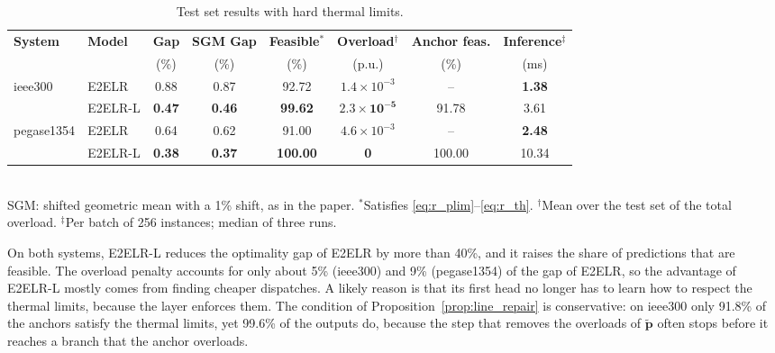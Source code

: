 \documentclass[12pt]{article}
\begin{document}
\begin{table}[!ht]
\centering
\caption{Test set results with hard thermal limits.}
\label{tab:results}
{\small\setlength{\tabcolsep}{4pt}
\begin{tabular}{llcccccc}
\toprule
\textbf{System} & \textbf{Model} & \textbf{Gap} & \textbf{SGM Gap} & \textbf{Feasible}$^{*}$ & \textbf{Overload}$^{\dagger}$ & \textbf{Anchor feas.} & \textbf{Inference}$^{\ddagger}$ \\
 & & (\%) & (\%) & (\%) & (p.u.) & (\%) & (ms) \\
\midrule
ieee300    & E2ELR   & 0.88 & 0.87 & 92.72 & $1.4 \times 10^{-3}$ & -- & \textbf{1.38} \\
           & E2ELR-L & \textbf{0.47} & \textbf{0.46} & \textbf{99.62} & $\mathbf{2.3 \times 10^{-5}}$ & 91.78 & 3.61 \\
\midrule
pegase1354 & E2ELR   & 0.64 & 0.62 & 91.00 & $4.6 \times 10^{-3}$ & -- & \textbf{2.48} \\
           & E2ELR-L & \textbf{0.38} & \textbf{0.37} & \textbf{100.00} & \textbf{0} & 100.00 & 10.34 \\
\bottomrule
\end{tabular}}\\[2pt]
{\footnotesize SGM: shifted geometric mean with a 1\% shift, as in the paper. $^{*}$Satisfies \eqref{eq:r_plim}--\eqref{eq:r_th}. $^{\dagger}$Mean over the test set of the total overload. $^{\ddagger}$Per batch of 256 instances; median of three runs.}
\end{table}

On both systems, E2ELR-L reduces the optimality gap of E2ELR by more than 40\%, and it raises the share of predictions that are feasible. The overload penalty accounts for only about 5\% (ieee300) and 9\% (pegase1354) of the gap of E2ELR, so the advantage of E2ELR-L mostly comes from finding cheaper dispatches.
A likely reason is that its first head no longer has to learn how to respect the thermal limits, because the layer enforces them.
The condition of Proposition~\ref{prop:line_repair} is conservative: on ieee300 only 91.8\% of the anchors satisfy the thermal limits, yet 99.6\% of the outputs do, because the step that removes the overloads of $\tilde{\boldsymbol{p}}$ often stops before it reaches a branch that the anchor overloads.
\end{document}
